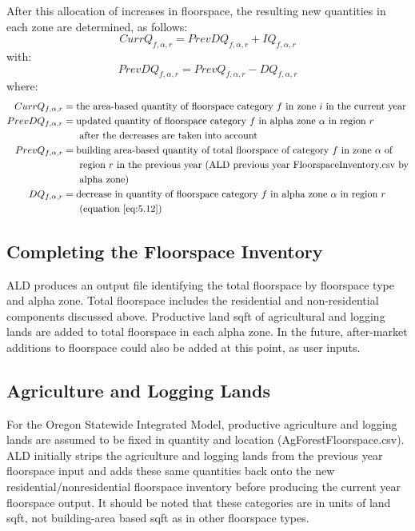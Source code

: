 After this allocation of increases in floorspace, the resulting new quantities in each zone are determined, as follows:
\begin{equation}   %
CurrQ_{f,\alpha,r} = PrevDQ_{f,\alpha,r} + IQ_{f,\alpha,r}
\end{equation}
\noindent with:
\begin{equation}  %
PrevDQ_{f,\alpha,r} = PrevQ_{f,\alpha,r} - DQ_{f,\alpha,r}
\end{equation}
\noindent where:
\begin{align*}
CurrQ_{f,\alpha,r} &= \text{the area-based quantity of floorspace category $f$ in zone $i$ in the current year} \\
PrevDQ_{f,\alpha,r} &= \text{updated quantity of floorspace category $f$ in alpha zone $\alpha$ in region $r$} \\
 &~~~~~\text{after the decreases are taken into account} \\
PrevQ_{f,\alpha,r} &= \text{building area-based quantity of total floorspace of category $f$ in zone $\alpha$ of} \\
 &~~~~~\text{region $r$ in the previous year (ALD previous year FloorspaceInventory.csv by} \\
 &~~~~~\text{alpha zone)} \\
DQ_{f,\alpha,r} &= \text{decrease in quantity of floorspace category $f$ in alpha zone $\alpha$ in region $r$} \\
 &~~~~~\text{(equation \ref{eq:5.12})}
\end{align*}

\subsection{Completing the Floorspace Inventory}\label{sec:ald-completing-inventory}   %
ALD produces an output file identifying the total floorspace by floorspace type and alpha zone. Total floorspace includes the residential and non-residential components discussed above. Productive land sqft of agricultural and logging lands are added to total floorspace in each alpha zone. In the future, after-market additions to floorspace could also be added at this point, as user inputs. 

\subsection{Agriculture and Logging Lands}
For the Oregon Statewide Integrated Model, productive agriculture and logging lands are assumed to be fixed in quantity and location (AgForestFloorspace.csv). ALD initially strips the agriculture and logging lands from the previous year floorspace input and adds these same quantities back onto the new residential/nonresidential floorspace inventory before producing the current year floorspace output. It should be noted that these categories are in units of land sqft, not building-area based sqft as in other floorspace types. 

